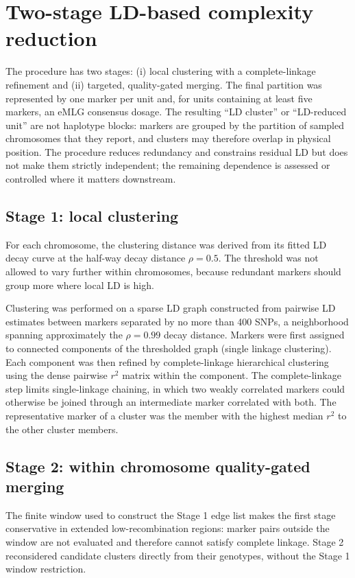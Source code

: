 \documentclass[11pt]{article}
\begin{document}
\section*{Two-stage LD-based complexity reduction}

The procedure has two stages: (i) local clustering with a complete-linkage refinement and (ii) targeted, quality-gated merging. The final partition was represented by one marker per unit and, for units containing at least five markers, an eMLG consensus dosage. The resulting ``LD cluster'' or ``LD-reduced unit'' are not haplotype blocks: markers are grouped by the partition of sampled chromosomes that they report, and clusters may therefore overlap in physical position. The procedure reduces redundancy and constrains residual LD but does not make them strictly independent; the remaining dependence is assessed or controlled where it matters downstream.

\subsection*{Stage 1: local clustering}

For each chromosome, the clustering distance was derived from its fitted LD decay curve at the half-way decay distance \(\rho=0.5\). The threshold was not allowed to vary further within chromosomes, because redundant markers should group more where local LD is high.

Clustering was performed on a sparse LD graph constructed from pairwise LD estimates between markers separated by no more than 400 SNPs, a neighborhood spanning approximately the $\rho=0.99$ decay distance. Markers were first assigned to connected components of the thresholded graph (single linkage clustering). Each component was then refined by complete-linkage hierarchical clustering using the dense pairwise \(r^2\) matrix within the component. The complete-linkage step limits single-linkage chaining, in which two weakly correlated markers could otherwise be joined through an intermediate marker correlated with both. The representative marker of a cluster was the member with the highest median \(r^2\) to the other cluster members.

\subsection*{Stage 2: within chromosome quality-gated merging}

The finite window used to construct the Stage 1 edge list makes the first stage conservative in extended low-recombination regions: marker pairs outside the window are not evaluated and therefore cannot satisfy complete linkage. Stage 2 reconsidered candidate clusters directly from their genotypes, without the Stage 1 window restriction.
\end{document}
